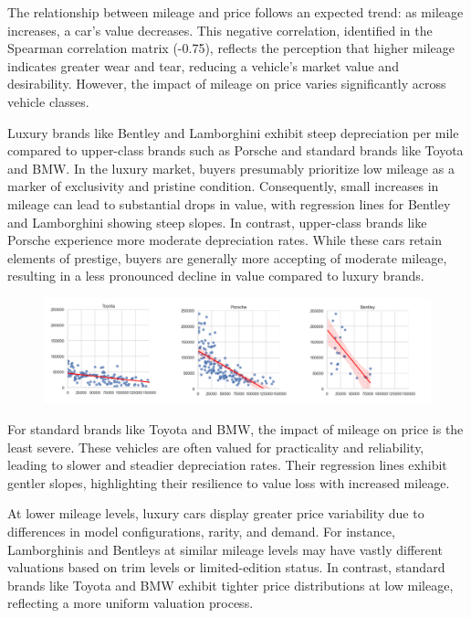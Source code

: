 \documentclass[a4paper,oneside,bibliography=totoc]{scrbook}
\begin{document}
The relationship between mileage and price follows an expected trend: as mileage increases, a car's value decreases. This negative correlation, identified in the Spearman correlation matrix (-0.75), reflects the perception that higher mileage indicates greater wear and tear, reducing a vehicle's market value and desirability. However, the impact of mileage on price varies significantly across vehicle classes.

Luxury brands like Bentley and Lamborghini exhibit steep depreciation per mile compared to upper-class brands such as Porsche and standard brands like Toyota and BMW. In the luxury market, buyers presumably prioritize low mileage as a marker of exclusivity and pristine condition. Consequently, small increases in mileage can lead to substantial drops in value, with regression lines for Bentley and Lamborghini showing steep slopes. In contrast, upper-class brands like Porsche experience more moderate depreciation rates. While these cars retain elements of prestige, buyers are generally more accepting of moderate mileage, resulting in a less pronounced decline in value compared to luxury brands.

\begin{figure}[h]
	\includegraphics[width=\linewidth]{images/milage_price.png}
	\centering
\end{figure}

For standard brands like Toyota and BMW, the impact of mileage on price is the least severe. These vehicles are often valued for practicality and reliability, leading to slower and steadier depreciation rates. Their regression lines exhibit gentler slopes, highlighting their resilience to value loss with increased mileage.

At lower mileage levels, luxury cars display greater price variability due to differences in model configurations, rarity, and demand. For instance, Lamborghinis and Bentleys at similar mileage levels may have vastly different valuations based on trim levels or limited-edition status. In contrast, standard brands like Toyota and BMW exhibit tighter price distributions at low mileage, reflecting a more uniform valuation process.
\end{document}
